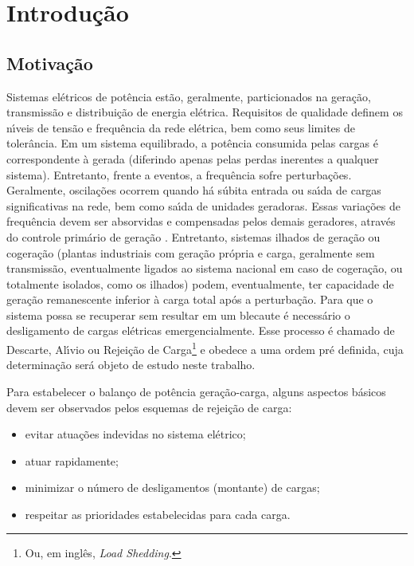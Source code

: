\chapter{Introdu{\c c}{\~a}o} \label{cap:intro}

\section{Motiva{\c c}{\~a}o} \label{sec:carac}

Sistemas el{\'e}tricos de pot{\^e}ncia est{\~a}o, geralmente, particionados na gera{\c c}{\~a}o, transmiss{\~a}o e distribui{\c c}{\~a}o de energia el{\'e}trica. Requisitos de qualidade definem os n{\'\i}veis de tens{\~a}o e frequ{\^e}ncia da rede el{\'e}trica, bem como seus limites de toler{\^a}ncia. Em um sistema equilibrado, a pot{\^e}ncia consumida pelas cargas {\'e} correspondente {\`a} gerada (diferindo apenas pelas perdas inerentes a qualquer sistema). Entretanto, frente a eventos, a frequ{\^e}ncia sofre perturba{\c c}{\~o}es. Geralmente, oscila{\c c}{\~o}es ocorrem quando h{\'a} s{\'u}bita entrada ou sa{\'\i}da de cargas significativas na rede, bem como sa{\'\i}da de unidades geradoras. Essas varia{\c c}{\~o}es de frequ{\^e}ncia devem ser absorvidas e compensadas pelos demais geradores, atrav{\'e}s do controle prim{\'a}rio de gera{\c c}{\~a}o \cite{1597614,6811137,6689316,6085887}. Entretanto, sistemas ilhados de gera{\c c}{\~a}o ou cogera{\c c}{\~a}o (plantas industriais com gera{\c c}{\~a}o pr{\'o}pria e carga, geralmente sem transmiss{\~a}o, eventualmente ligados ao sistema nacional em caso de cogera{\c c}{\~a}o, ou totalmente isolados, como os ilhados) podem, eventualmente, ter capacidade de gera{\c c}{\~a}o remanescente inferior {\`a} carga total ap{\'o}s a perturba{\c c}{\~a}o. Para que o sistema possa se recuperar sem resultar em um blecaute {\'e} necess{\'a}rio o desligamento de cargas el{\'e}tricas emergencialmente. Esse processo {\'e} chamado de Descarte, Al{\'\i}vio ou Rejei{\c c}{\~a}o de Carga\footnote{Ou, em ingl{\^e}s, \textit{Load Shedding}.} e obedece a uma ordem pr{\'e} definida, cuja determina{\c c}{\~a}o ser{\'a} objeto de estudo neste trabalho.

Para estabelecer o balan{\c c}o de pot{\^e}ncia gera{\c c}{\~a}o-carga, alguns aspectos b{\'a}sicos devem ser observados pelos esquemas de rejei{\c c}{\~a}o de carga:

\begin{itemize}
    \item evitar atua{\c c}{\~o}es indevidas no sistema el{\'e}trico;
    \item atuar rapidamente;
    \item minimizar o n{\'u}mero de desligamentos (montante) de cargas;
    \item respeitar as prioridades estabelecidas para cada carga.
\end{itemize}

